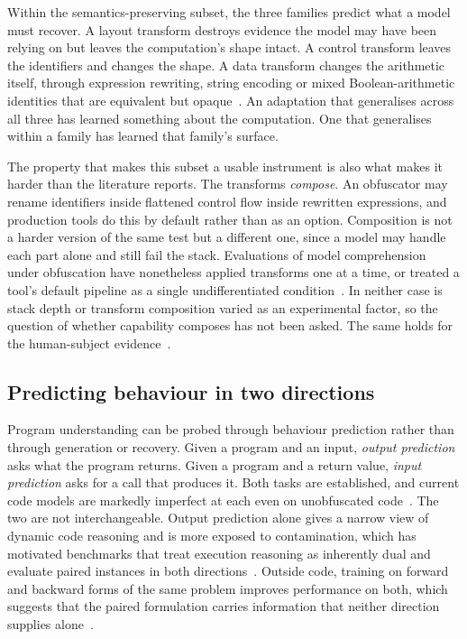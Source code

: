 Within the semantics-preserving subset, the three families predict what a model must recover. A
layout transform destroys evidence the model may have been relying on but leaves the computation's
shape intact. A control transform leaves the identifiers and changes the shape. A data transform
changes the arithmetic itself, through expression rewriting, string encoding or mixed
Boolean-arithmetic identities that are equivalent but opaque~\cite{zhou2007mba}. An adaptation that
generalises across all three has learned something about the computation. One that generalises within
a family has learned that family's surface.

The property that makes this subset a usable instrument is also what makes it harder than the
literature reports. The transforms \emph{compose}. An obfuscator may rename identifiers inside
flattened control flow inside rewritten expressions, and production tools do this by default rather
than as an option. Composition is not a harder version of the same test but a different one, since a
model may handle each part alone and still fail the stack. Evaluations of model comprehension under
obfuscation have nonetheless applied transforms one at a time, or treated a tool's default pipeline
as a single undifferentiated condition~\cite{nikiema2025codebarrier,rong2025obfuscation}. In neither
case is stack depth or transform composition varied as an experimental factor, so the question of
whether capability composes has not been asked. The same holds for the human-subject
evidence~\cite{nguyen2026human}.


\subsection{Predicting behaviour in two directions}
Program understanding can be probed through behaviour prediction rather than through
generation or recovery. Given a program and an input, \emph{output prediction} asks what the
program returns. Given a program and a return value, \emph{input prediction} asks for a call
that produces it. Both tasks are established, and current code models are markedly imperfect
at each even on unobfuscated code~\cite{cruxeval}. The two are not interchangeable. Output
prediction alone gives a narrow view of dynamic code reasoning and is more exposed to
contamination, which has motivated benchmarks that treat execution reasoning as inherently
dual and evaluate paired instances in both directions~\cite{dexbench}. Outside code,
training on forward and backward forms of the same problem improves performance on both,
which suggests that the paired formulation carries information that neither direction
supplies alone~\cite{revthink}.

